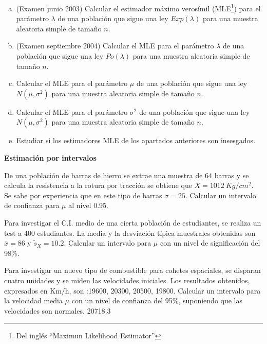 \documentclass[12pt]{article}\usepackage[]{graphicx}\usepackage[]{color}
\begin{document}
\begin{prob}
\begin{enumerate}[a)]
\item (Examen junio 2003) Calcular el estimador máximo verosímil (MLE\footnote{Del inglés
``Maximun Likelihood  Estimator''}) para el parámetro $\lambda$ de una población que
sigue una ley $Exp(\lambda)$ para una muestra aleatoria simple de tamaño $n$.
\item (Examen septiembre 2004) Calcular el MLE para el parámetro $\lambda$ de una población
que sigue una ley $Po(\lambda)$ para una muestra aleatoria simple de tamaño $n$.
\item  Calcular el MLE para el parámetro $\mu$ de una población
que sigue una ley $N(\mu,\sigma^2)$ para una muestra aleatoria simple de tamaño $n$.
\item  Calcular el MLE para el parámetro $\sigma^2$ de una población
que sigue una ley $N(\mu,\sigma^2)$ para una muestra aleatoria simple de tamaño $n$.
\item Estudiar si los estimadores MLE de los apartados anteriores son insesgados.
\end{enumerate}
\end{prob}




\textbf{Estimación por intervalos}

\begin{prob}
De una población de barras de hierro se extrae una muestra de $64$ barras y  se calcula la
resistencia a la rotura por tracción se obtiene que $\overline{X}=1012\ Kg/cm^{2}$. Se sabe
por experiencia que en este tipo de barras $\sigma=25$. Calcular un intervalo de confianza
para $\mu$ al nivel 0.95. 
\end{prob}

\begin{prob}
Para investigar el C.I. medio de una cierta población de estudiantes, se realiza un test a
$400$ estudiantes. La media y la desviación típica  muestrales obtenidas son
$\overline{x}=86$ y $\tilde{s}_{X}=10.2$. Calcular un intervalo para $\mu$ con un nivel de
significación del 98\%. 
\end{prob}

\begin{prob}
Para investigar un nuevo tipo de combustible para cohetes espaciales, se disparan cuatro
unidades y se miden las velocidades iniciales. Los resultados obtenidos, expresados en
Km/h, son :19600, 20300, 20500, 19800. Calcular un intervalo para la velocidad media $\mu$
con un nivel de confianza del 95\%, suponiendo que las velocidades son normales.
 20718.3
\end{prob}
\end{document}

